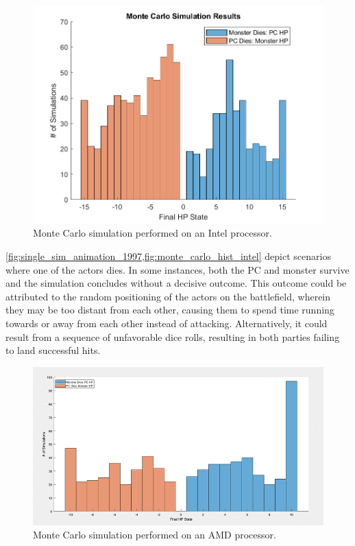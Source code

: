 \documentclass[letterpaper, 10 pt, conference]{ieeeconf}
\begin{document}
\begin{figure}[thb]
    \centering
    \includegraphics[scale = 0.5]{figs/DND_monte_carlo_hist.png}
    \caption{Monte Carlo simulation performed on an Intel processor.}
    \label{fig:monte_carlo_hist_intel}
\end{figure}


\cref{fig:single_sim_animation_1997,fig:monte_carlo_hist_intel} depict scenarios where one of the actors dies. 
In some instances, both the PC and monster survive and the simulation concludes without a decisive outcome. 
This outcome could be attributed to the random positioning of the actors on the battlefield, wherein they may be too distant from each other, causing them to spend time running towards or away from each other instead of attacking. 
Alternatively, it could result 
from a sequence of unfavorable dice rolls, resulting in both parties failing to land successful hits.



\begin{figure}[thb]
    \centering
    \includegraphics[width=\columnwidth]{figs/DND_MChist_AMD.png}
    \caption{Monte Carlo simulation performed on an AMD processor.}
\end{figure}
\end{document}

